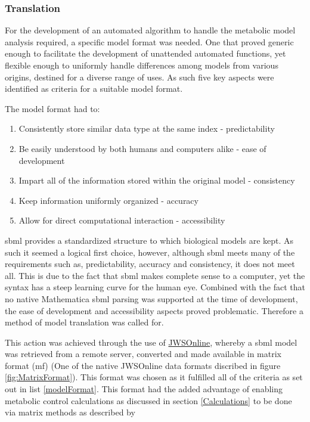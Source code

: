 \subsubsection{Translation}\label{Translation}
For the development of an automated algorithm to handle the metabolic model analysis required, a specific model format was needed. One that proved generic enough to facilitate the development of unattended automated functions, yet flexible enough to uniformly handle differences among models from various origins, destined for a diverse range of uses. As such five key aspects were identified as criteria for a suitable model format.

The model format had to: 
\begin{enumerate} \label{modelFormat}
  \item Consistently store similar data type at the same index - predictability
  \item Be easily understood by both humans and computers alike - ease of development
  \item Impart all of the information stored within the original model - consistency
  \item Keep information uniformly organized - accuracy
  \item Allow for direct computational interaction - accessibility
\end{enumerate}

\gls{sbml} provides a standardized structure to which biological models are kept. As such it seemed a logical first choice, however, although \gls{sbml} meets many of the requirements such as, predictability, accuracy and consistency, it does not meet all. This is due to the fact that \gls{sbml} makes complete sense to a computer, yet the syntax has a steep learning curve for the human eye. Combined with the fact that no native Mathematica \gls{sbml} parsing was supported at the time of development, the ease of development and accessibility aspects proved problematic. Therefore a method of model translation was called for. 

This action was achieved through the use of \href{https://jjj.bio.vu.nl}{JWSOnline}, whereby a \gls{sbml} model was retrieved from a remote server, converted and made available in matrix format (\gls{mf}) (One of the native JWSOnline data formats discribed in figure \ref{fig:MatrixFormat}). This format was chosen as it fulfilled all of the criteria as set out in list \ref{modelFormat}. This format had the added advantage of enabling metabolic control calculations as discussed in section \ref{Calculations} to be done via matrix methods as described by \citeauthor{Hofmeyr2001}


